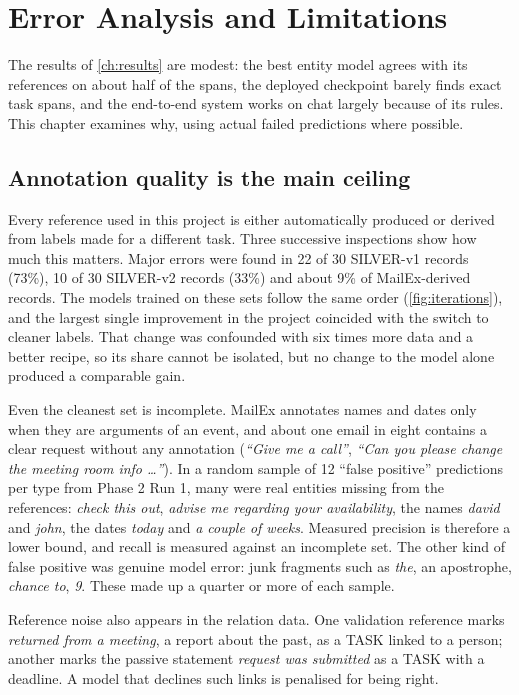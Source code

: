 \chapter{Error Analysis and Limitations}
\label{ch:errors}

The results of \cref{ch:results} are modest: the best entity model agrees with its references on about half of the spans, the deployed checkpoint barely finds exact task spans, and the end-to-end system works on chat largely because of its rules. This chapter examines why, using actual failed predictions where possible.

\section{Annotation quality is the main ceiling}
Every reference used in this project is either automatically produced or derived from labels made for a different task. Three successive inspections show how much this matters. Major errors were found in 22 of 30 SILVER-v1 records (73\%), 10 of 30 SILVER-v2 records (33\%) and about 9\% of MailEx-derived records. The models trained on these sets follow the same order (\cref{fig:iterations}), and the largest single improvement in the project coincided with the switch to cleaner labels. That change was confounded with six times more data and a better recipe, so its share cannot be isolated, but no change to the model alone produced a comparable gain.

Even the cleanest set is incomplete. MailEx annotates names and dates only when they are arguments of an event, and about one email in eight contains a clear request without any annotation (\emph{``Give me a call''}, \emph{``Can you please change the meeting room info \ldots''}). In a random sample of 12 ``false positive'' predictions per type from Phase 2 Run 1, many were real entities missing from the references: \emph{check this out}, \emph{advise me regarding your availability}, the names \emph{david} and \emph{john}, the dates \emph{today} and \emph{a couple of weeks}. Measured precision is therefore a lower bound, and recall is measured against an incomplete set. The other kind of false positive was genuine model error: junk fragments such as \emph{the}, an apostrophe, \emph{chance to}, \emph{9}. These made up a quarter or more of each sample.

Reference noise also appears in the relation data. One validation reference marks \emph{returned from a meeting}, a report about the past, as a TASK linked to a person; another marks the passive statement \emph{request was submitted} as a TASK with a deadline. A model that declines such links is penalised for being right.


